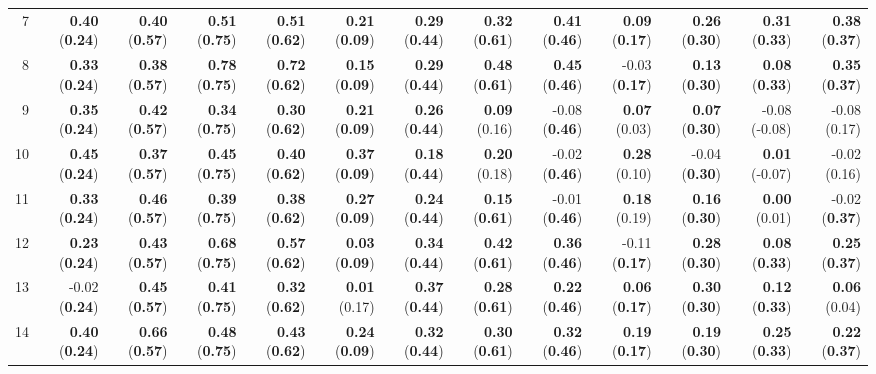\begin{sidewaystable}[ht]
\begin{center}
\begin{tabular}{rrrrr|rrrr|rrrr}
  7 & {\bf 0.40} ({\bf 0.24}) & {\bf 0.40} ({\bf 0.57}) & {\bf 0.51} ({\bf 0.75}) & {\bf 0.51} ({\bf 0.62}) & {\bf 0.21} ({\bf 0.09}) & {\bf 0.29} ({\bf 0.44}) & {\bf 0.32} ({\bf 0.61}) & {\bf 0.41} ({\bf 0.46}) & {\bf 0.09} ({\bf 0.17}) & {\bf 0.26} ({\bf 0.30}) & {\bf 0.31} ({\bf 0.33}) & {\bf 0.38} ({\bf 0.37}) \\ 
  8 & {\bf 0.33} ({\bf 0.24}) & {\bf 0.38} ({\bf 0.57}) & {\bf 0.78} ({\bf 0.75}) & {\bf 0.72} ({\bf 0.62}) & {\bf 0.15} ({\bf 0.09}) & {\bf 0.29} ({\bf 0.44}) & {\bf 0.48} ({\bf 0.61}) & {\bf 0.45} ({\bf 0.46}) & -0.03 ({\bf 0.17}) & {\bf 0.13} ({\bf 0.30}) & {\bf 0.08} ({\bf 0.33}) & {\bf 0.35} ({\bf 0.37}) \\ 
  9 & {\bf 0.35} ({\bf 0.24}) & {\bf 0.42} ({\bf 0.57}) & {\bf 0.34} ({\bf 0.75}) & {\bf 0.30} ({\bf 0.62}) & {\bf 0.21} ({\bf 0.09}) & {\bf 0.26} ({\bf 0.44}) & {\bf 0.09} (0.16) & -0.08 ({\bf 0.46}) & {\bf 0.07} (0.03) & {\bf 0.07} ({\bf 0.30}) & -0.08 (-0.08) & -0.08 (0.17) \\ 
  10 & {\bf 0.45} ({\bf 0.24}) & {\bf 0.37} ({\bf 0.57}) & {\bf 0.45} ({\bf 0.75}) & {\bf 0.40} ({\bf 0.62}) & {\bf 0.37} ({\bf 0.09}) & {\bf 0.18} ({\bf 0.44}) & {\bf 0.20} (0.18) & -0.02 ({\bf 0.46}) & {\bf 0.28} (0.10) & -0.04 ({\bf 0.30}) & {\bf 0.01} (-0.07) & -0.02 (0.16) \\ 
  11 & {\bf 0.33} ({\bf 0.24}) & {\bf 0.46} ({\bf 0.57}) & {\bf 0.39} ({\bf 0.75}) & {\bf 0.38} ({\bf 0.62}) & {\bf 0.27} ({\bf 0.09}) & {\bf 0.24} ({\bf 0.44}) & {\bf 0.15} ({\bf 0.61}) & -0.01 ({\bf 0.46}) & {\bf 0.18} (0.19) & {\bf 0.16} ({\bf 0.30}) & {\bf 0.00} (0.01) & -0.02 ({\bf 0.37}) \\ 
  12 & {\bf 0.23} ({\bf 0.24}) & {\bf 0.43} ({\bf 0.57}) & {\bf 0.68} ({\bf 0.75}) & {\bf 0.57} ({\bf 0.62}) & {\bf 0.03} ({\bf 0.09}) & {\bf 0.34} ({\bf 0.44}) & {\bf 0.42} ({\bf 0.61}) & {\bf 0.36} ({\bf 0.46}) & -0.11 ({\bf 0.17}) & {\bf 0.28} ({\bf 0.30}) & {\bf 0.08} ({\bf 0.33}) & {\bf 0.25} ({\bf 0.37}) \\ 
  13 & -0.02 ({\bf 0.24}) & {\bf 0.45} ({\bf 0.57}) & {\bf 0.41} ({\bf 0.75}) & {\bf 0.32} ({\bf 0.62}) & {\bf 0.01} (0.17) & {\bf 0.37} ({\bf 0.44}) & {\bf 0.28} ({\bf 0.61}) & {\bf 0.22} ({\bf 0.46}) & {\bf 0.06} ({\bf 0.17}) & {\bf 0.30} ({\bf 0.30}) & {\bf 0.12} ({\bf 0.33}) & {\bf 0.06} (0.04) \\ 
  14 & {\bf 0.40} ({\bf 0.24}) & {\bf 0.66} ({\bf 0.57}) & {\bf 0.48} ({\bf 0.75}) & {\bf 0.43} ({\bf 0.62}) & {\bf 0.24} ({\bf 0.09}) & {\bf 0.32} ({\bf 0.44}) & {\bf 0.30} ({\bf 0.61}) & {\bf 0.32} ({\bf 0.46}) & {\bf 0.19} ({\bf 0.17}) & {\bf 0.19} ({\bf 0.30}) & {\bf 0.25} ({\bf 0.33}) & {\bf 0.22} ({\bf 0.37}) \\ 

\end{tabular}
\end{center}
\end{sidewaystable}
